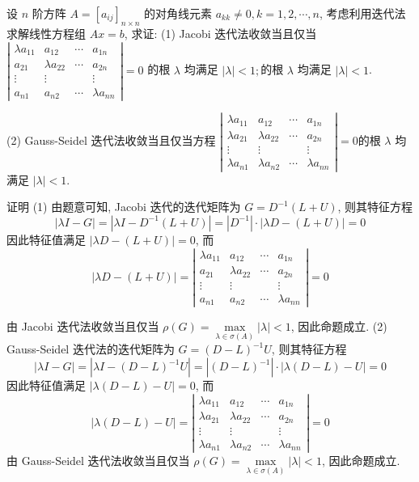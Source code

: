  \begin{tcolorbox}[enhanced,colback=blue!8!white,colframe=blue!25!white,breakable,title=2024]


 设 $ n $ 阶方阵 $ A=\left[a_{i j}\right]_{n \times n} $ 的对角线元素 $ a_{k k} \neq 0, k=1,2, \cdots, n $, 考虑利用迭代法求解线性方程组 $ A x=b $, 求证:
(1) Jacobi 迭代法收敛当且仅当 $ \left|\begin{array}{cccc}\lambda a_{11} & a_{12} & \cdots & a_{1 n} \\ a_{21} & \lambda a_{22} & \cdots & a_{2 n} \\ \vdots & \vdots & & \vdots \\ a_{n 1} & a_{n 2} & \cdots & \lambda a_{n n}\end{array}\right|=0 $ 的根 $ \lambda $ 均满足 $ |\lambda|<1 ; $的根 $ \lambda $ 均满足 $ |\lambda|<1 $.

(2) Gauss-Seidel 迭代法收敛当且仅当方程 $ \left|\begin{array}{cccc}\lambda a_{11} & a_{12} & \cdots & a_{1 n} \\ \lambda a_{21} & \lambda a_{22} & \cdots & a_{2 n} \\ \vdots & \vdots & & \vdots \\ \lambda a_{n 1} & \lambda a_{n 2} & \cdots & \lambda a_{n n}\end{array}\right|=0 $的根 $ \lambda $ 均满足 $ |\lambda|<1 $.

 \tcblower

证明 (1) 由题意可知, Jacobi 迭代的迭代矩阵为 $ G=D^{-1}(L+U) $, 则其特征方程
$$
|\lambda I-G|=\left|\lambda I-D^{-1}(L+U)\right|=\left|D^{-1}\right| \cdot|\lambda D-(L+U)|=0
$$
因此特征值满足 $ |\lambda D-(L+U)|=0 $, 而
$$
|\lambda D-(L+U)|=\left|\begin{array}{cccc}
\lambda a_{11} & a_{12} & \cdots & a_{1 n} \\
a_{21} & \lambda a_{22} & \cdots & a_{2 n} \\
\vdots & \vdots & & \vdots \\
a_{n 1} & a_{n 2} & \cdots & \lambda a_{n n}
\end{array}\right|=0
$$

由 Jacobi 迭代法收敛当且仅当 $ \rho(G)=\max\limits _{\lambda \in \sigma(A)}|\lambda|<1 $, 因此命题成立.
(2) Gauss-Seidel 迭代法的迭代矩阵为 $ G=(D-L)^{-1} U $, 则其特征方程
$$
|\lambda I-G|=\left|\lambda I-(D-L)^{-1} U\right|=\left|(D-L)^{-1}\right| \cdot|\lambda(D-L)-U|=0
$$
因此特征值满足 $ |\lambda(D-L)-U|=0 $, 而
$$
|\lambda(D-L)-U|=\left|\begin{array}{cccc}
\lambda a_{11} & a_{12} & \cdots & a_{1 n} \\
\lambda a_{21} & \lambda a_{22} & \cdots & a_{2 n} \\
\vdots & \vdots & & \vdots \\
\lambda a_{n 1} & \lambda a_{n 2} & \cdots & \lambda a_{n n}
\end{array}\right|=0
$$
由 Gauss-Seidel 迭代法收敛当且仅当 $ \rho(G)=\max\limits _{\lambda \in \sigma(A)}|\lambda|<1 $, 因此命题成立.
 \end{tcolorbox}


